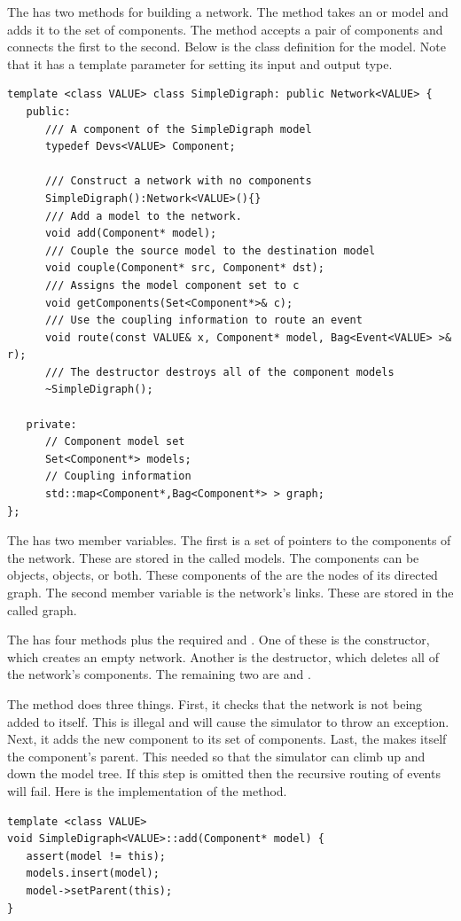 The  has two methods for building a network. The  method takes an  or  model and adds it to the set of components. The  method accepts a pair of components and connects the first to the second. Below is the class definition for the model. Note that it has a template parameter for setting its input and output type.  
\begin{verbatim}
template <class VALUE> class SimpleDigraph: public Network<VALUE> { 
   public:
      /// A component of the SimpleDigraph model
      typedef Devs<VALUE> Component;

      /// Construct a network with no components
      SimpleDigraph():Network<VALUE>(){}
      /// Add a model to the network.
      void add(Component* model);
      /// Couple the source model to the destination model  
      void couple(Component* src, Component* dst);
      /// Assigns the model component set to c
      void getComponents(Set<Component*>& c);
      /// Use the coupling information to route an event
      void route(const VALUE& x, Component* model, Bag<Event<VALUE> >& r);
      /// The destructor destroys all of the component models
      ~SimpleDigraph();

   private:   
      // Component model set
      Set<Component*> models;
      // Coupling information
      std::map<Component*,Bag<Component*> > graph;
};
\end{verbatim}
The  has two member variables. The first is a set of pointers to the components of the network. These are stored in the  called models. The components can be  objects,  objects, or both. These components of the  are the nodes of its directed graph. The second member variable is the network's links. These are stored in the  called graph.

The  has four methods plus the required  and . One of these is the constructor, which creates an empty network. Another is the destructor, which deletes all of the network's components. The remaining two are  and .

The  method does three things. First, it checks that the network is not being added to itself. This is illegal and will cause the simulator to throw an exception. Next, it adds the new component to its set of components. Last, the  makes itself the component's parent. This needed so that the simulator can climb up and down the model tree. If this step is omitted then the recursive routing of events will fail. Here is the implementation of the  method.
\begin{verbatim}
template <class VALUE> 
void SimpleDigraph<VALUE>::add(Component* model) {
   assert(model != this);
   models.insert(model);
   model->setParent(this);
}
\end{verbatim}

